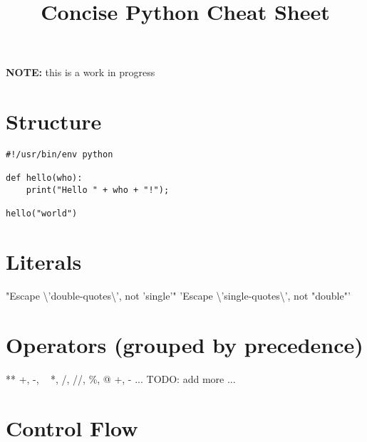 \documentclass{refcard}
\title{Concise Python Cheat Sheet}
\begin{document}
\maketitle

\vspace{4em}
\centering
{\Large\textbf{NOTE:} this is a work in progress}
\vspace{4em}

\section{Structure}

\begin{verbatim}
#!/usr/bin/env python

def hello(who):
    print("Hello " + who + "!");

hello("world")
\end{verbatim}



\section{Literals}

\begin{ldesc}
	    "Escape \textbackslash{}'double-quotes\textbackslash{}', not 'single'"
	    'Escape \textbackslash{}'single-quotes\textbackslash{}', not "double"'
\end{ldesc}


\section{Operators (grouped by precedence)}

\begin{Ldesc}
	\Li[exponentiation]                  **
	 +, -, ~
	     *, /, //, \%, @
	        +, -
	\Li[...] ... TODO: add more ...
\end{Ldesc}


\section{Control Flow}
\end{document}

